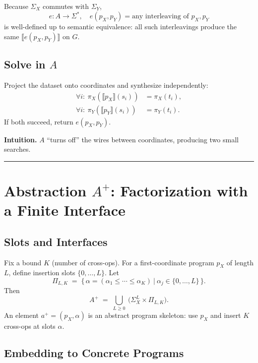 \documentclass[11pt]{article}
\begin{document}
Because $\Sigma_X$ commutes with $\Sigma_Y$,
\begin{equation}
e:A\to \Sigma^{*},\quad e(p_X,p_Y)=\text{any interleaving of }p_X,p_Y
\end{equation}
is well-defined up to semantic equivalence: all such interleavings produce the same $\llbracket e(p_X,p_Y)\rrbracket$ on $G$.

\subsection{Solve in $A$}

Project the dataset onto coordinates and synthesize independently:
\begin{align}
\forall i:\ \pi_X(\llbracket p_X\rrbracket(s_i))&=\pi_X(t_i),\\
\forall i:\ \pi_Y(\llbracket p_Y\rrbracket(s_i))&=\pi_Y(t_i).
\end{align}
If both succeed, return $e(p_X,p_Y)$.

\textbf{Intuition.} $A$ ``turns off'' the wires between coordinates, producing two small searches.

\vspace{6pt}\noindent\rule{\textwidth}{0.4pt}\vspace{6pt}

\section{Abstraction $A^{+}$: Factorization with a Finite Interface}

\subsection{Slots and Interfaces}

Fix a bound $K$ (number of cross-ops). For a first-coordinate program $p_X$ of length $L$, define insertion slots $\{0,\dots,L\}$. Let
\begin{equation}
\Pi_{L,K} \;=\; \big\{\,\alpha=(\alpha_1\le\cdots\le\alpha_K)\ \big|\ \alpha_j\in\{0,\dots,L\}\,\big\}.
\end{equation}
Then
\begin{equation}
A^{+} \;=\; \bigcup_{L\ge 0}\ \big(\Sigma_X^{L}\times \Pi_{L,K}\big).
\end{equation}
An element $a^{+}=(p_X,\alpha)$ is an abstract program skeleton: use $p_X$ and insert $K$ cross-ops at slots $\alpha$.

\subsection{Embedding to Concrete Programs}
\end{document}
